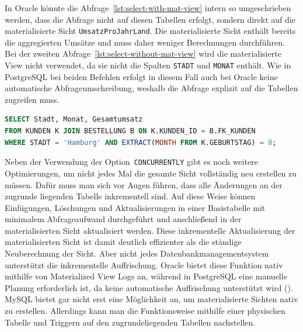 In Oracle könnte die Abfrage~\ref{lst:select-with-mat-view} intern so umgeschrieben werden, dass die Abfrage nicht auf diesen Tabellen erfolgt, sondern direkt auf die materialisierte Sicht \texttt{UmsatzProJahrLand}.
Die materialisierte Sicht enthält bereits die aggregierten Umsätze und muss daher weniger Berechnungen durchführen.
Bei der zweiten Abfrage~\ref{lst:select-without-mat-view} wird die materialisierte View nicht verwendet, da sie nicht die Spalten \texttt{STADT} und \texttt{MONAT} enthält.
Wie in PostgreSQL bei beiden Befehlen erfolgt in diesem Fall auch bei Oracle keine automatische Abfrageumschreibung, weshalb die Abfrage explizit auf die Tabellen zugreifen muss.

\vspace{-5pt}
\begin{lstlisting}[language=SQL,caption=Select nicht für View,label={lst:select-without-mat-view}]
SELECT Stadt, Monat, Gesamtumsatz
FROM KUNDEN K JOIN BESTELLUNG B ON K.KUNDEN_ID = B.FK_KUNDEN
WHERE STADT = 'Hamburg' AND EXTRACT(MONTH FROM K.GEBURTSTAG) = 8;
\end{lstlisting}
\vspace{-5pt}

Neben der Verwendung der Option~\texttt{CONCURRENTLY} gibt es noch weitere Optimierungen, um nicht jedes Mal die gesamte Sicht vollständig neu erstellen zu müssen.
Dafür muss man sich vor Augen führen, dass alle Änderungen an der zugrunde liegenden Tabelle inkrementell sind.
Auf diese Weise können Einfügungen, Löschungen und Aktualisierungen in einer Basistabelle mit minimalem Abfrageaufwand durchgeführt und anschließend in der materialisierten Sicht aktualisiert werden.
Diese inkrementelle Aktualisierung der materialisierten Sicht ist damit deutlich effizienter als die ständige Neuberechnung der Sicht.
Aber nicht jedes Datenbankmanagementsystem unterstützt die inkrementelle Auffrischung.
Oracle bietet diese Funktion nativ mithilfe von Materialized View Logs an, während in PostgreSQL eine manuelle Planung erforderlich ist, da keine automatische Auffrischung unterstützt wird (\cite{mat_view_features_per_db}).
MySQL bietet gar nicht erst eine Möglichkeit an, um materialisierte Sichten nativ zu erstellen.
Allerdings kann man die Funktionsweise mithilfe einer physischen Tabelle und Triggern auf den zugrundeliegenden Tabellen nachstellen.

